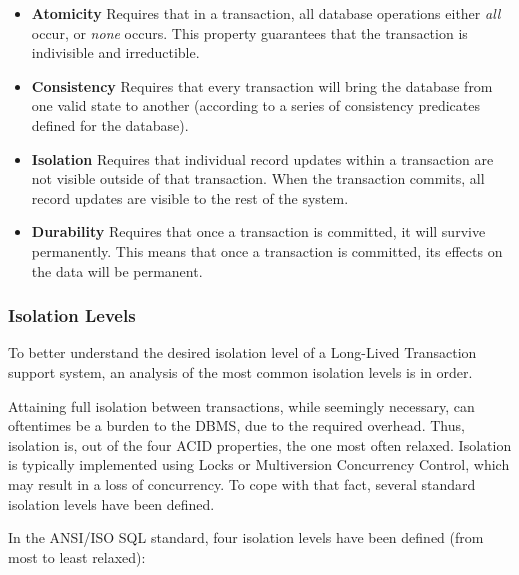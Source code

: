 \documentclass{llncs}
\begin{document}
\begin{itemize}

\item {\bf Atomicity} Requires that in a transaction, all database
  operations either {\it all} occur, or {\it none} occurs. This
  property guarantees that the transaction is indivisible and
  irreductible.

\item {\bf Consistency} Requires that every transaction will bring the
  database from one valid state to another (according to a series of
  consistency predicates defined for the database).

\item {\bf Isolation} Requires that individual record updates within a
  transaction are not visible outside of that transaction. When the
  transaction commits, all record updates are visible to the rest of
  the system.

\item {\bf Durability} Requires that once a transaction is committed,
  it will survive permanently. This means that once a transaction is
  committed, its effects on the data will be permanent.

\end{itemize}

\subsubsection{Isolation Levels}
\label{sec:isolation}

To better understand the desired isolation level of a Long-Lived
Transaction support system, an analysis of the most common isolation
levels is in order.

Attaining full isolation between transactions, while seemingly
necessary, can oftentimes be a burden to the DBMS, due to the required
overhead. Thus, isolation is, out of the four ACID properties, the one
most often relaxed. Isolation is typically implemented using Locks or
Multiversion Concurrency Control, which may result in a loss of
concurrency. To cope with that fact, several standard isolation levels
have been defined.

In the ANSI/ISO SQL standard\cite{melton1992ansi}, four isolation
levels have been defined (from most to least relaxed):
\end{document}
